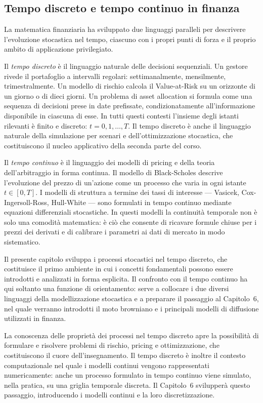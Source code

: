 \subsection{Tempo discreto e tempo continuo in finanza}

La matematica finanziaria ha sviluppato due linguaggi paralleli per
descrivere l'evoluzione stocastica nel tempo, ciascuno con i propri
punti di forza e il proprio ambito di applicazione privilegiato.

Il \emph{tempo discreto} \`{e} il linguaggio naturale delle decisioni
sequenziali. Un gestore rivede il portafoglio a intervalli regolari:
settimanalmente, mensilmente, trimestralmente. Un modello di rischio
calcola il Value-at-Risk su un orizzonte di un giorno o di dieci giorni.
Un problema di asset allocation si formula come una sequenza di decisioni
prese in date prefissate, condizionatamente all'informazione disponibile
in ciascuna di esse. In tutti questi contesti l'insieme degli istanti
rilevanti \`{e} finito e discreto: $t = 0, 1, \ldots, T$. Il tempo
discreto \`{e} anche il linguaggio naturale della simulazione per scenari
e dell'ottimizzazione stocastica, che costituiscono il nucleo applicativo
della seconda parte del corso.

Il \emph{tempo continuo} \`{e} il linguaggio dei modelli di pricing e
della teoria dell'arbitraggio in forma continua. Il modello di
Black-Scholes descrive l'evoluzione del prezzo di un'azione come un
processo che varia in ogni istante $t \in [0,T]$. I modelli di struttura
a termine dei tassi di interesse --- Vasicek, Cox-Ingersoll-Ross,
Hull-White --- sono formulati in tempo continuo mediante equazioni
differenziali stocastiche. In questi modelli la continuit\`{a} temporale
non \`{e} solo una comodit\`{a} matematica: \`{e} ci\`{o} che consente
di ricavare formule chiuse per i prezzi dei derivati e di calibrare i
parametri ai dati di mercato in modo sistematico.

Il presente capitolo sviluppa i processi stocastici nel tempo discreto,
che costituisce il primo ambiente in cui i concetti fondamentali possono
essere introdotti e analizzati in forma esplicita. Il confronto con il
tempo continuo ha qui soltanto una funzione di orientamento: serve a
collocare i due diversi linguaggi della modellizzazione stocastica e a
preparare il passaggio al Capitolo~6, nel quale verranno introdotti il
moto browniano e i principali modelli di diffusione utilizzati in finanza.

La conoscenza delle propriet\`{a} dei processi nel tempo discreto apre la
possibilit\`{a} di formulare e risolvere problemi di rischio, pricing e
ottimizzazione, che costituiscono il cuore dell'insegnamento.
Il tempo discreto \`{e} inoltre il contesto computazionale nel quale i
modelli continui vengono rappresentati numericamente: anche un processo
formulato in tempo continuo viene simulato, nella pratica, su una griglia
temporale discreta. Il Capitolo~6 svilupper\`{a} questo passaggio,
introducendo i modelli continui e la loro discretizzazione.

